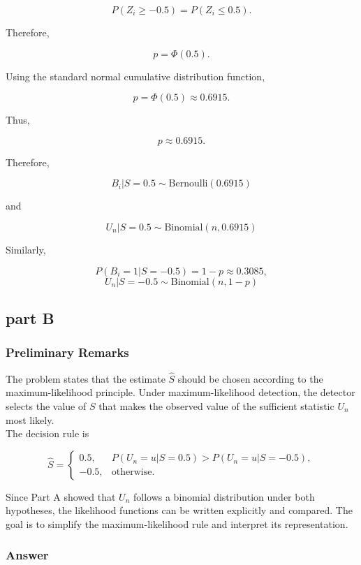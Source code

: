 \documentclass[12pt,a4paper]{article}
\begin{document}
\[
P(Z_i\geq -0.5)=P(Z_i\leq 0.5).
\]

Therefore,

\[
p=\Phi(0.5).
\]

Using the standard normal cumulative distribution function,

\[
p=\Phi(0.5)\approx 0.6915.
\]

Thus,

\[
\boxed{p\approx 0.6915}.
\]

Therefore,

\[
\boxed{B_i|S=0.5 \sim \text{Bernoulli}(0.6915)}
\]

and

\[
\boxed{U_n|S=0.5 \sim \text{Binomial}(n,0.6915)}
\]

Similarly,

\[
P(B_i=1|S=-0.5)=1-p\approx 0.3085,
\]
\[
\boxed{U_n|S=-0.5 \sim \text{Binomial}(n,1-p)}
\]

\subsection{part B}

\subsubsection{Preliminary Remarks}

The problem states that the estimate \(\hat{S}\) should be chosen according to the maximum-likelihood principle. Under maximum-likelihood detection, the detector selects the value of \(S\) that makes the observed value of the sufficient statistic \(U_n\) most likely.\\

The decision rule is

\[
\hat{S}=
\begin{cases}
0.5, & P(U_n=u|S=0.5)>
P(U_n=u|S=-0.5),\\
-0.5, & \text{otherwise}.
\end{cases}
\]

Since Part A showed that \(U_n\) follows a binomial distribution under both hypotheses, the likelihood functions can be written explicitly and compared. The goal is to simplify the maximum-likelihood rule and interpret its representation. 

\subsubsection{Answer}
\end{document}
